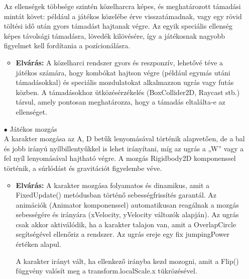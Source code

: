 \documentclass[
]{thesis-ekf}
\theoremstyle{definition}
\theoremstyle{remark}
\begin{document}
\begin{itemize}
	Az ellenségek többsége szintén közelharcra képes, és meghatározott támadási mintát követ: például a játékos közelébe érve visszatámadnak, vagy egy rövid töltési idő után gyors támadást hajtanak végre. Az egyik speciális ellenség képes távolsági támadásra, lövedék kilövésére, így a játékosnak nagyobb figyelmet kell fordítania a pozícionálásra.
	\begin{itemize}
		\item \textbf{Elvárás:} A közelharci rendszer gyors és reszponzív, lehetővé téve a játékos számára, hogy kombókat hajtson végre (például egymás utáni támadásokkal) és speciális mozdulatokat alkalmazzon ugrás vagy futás közben. A támadásokhoz ütközésérzékelés (BoxCollider2D, Raycast stb.) társul, amely pontosan meghatározza, hogy a támadás eltalálta-e az ellenséget.
	\end{itemize}
	\item[$\bullet$] Játékos mozgás\\A karakter mozgása az A, D betűk lenyomásával történik alapvetően, de a bal és jobb irányú nyílbillentyűkkel is lehet irányítani, míg az ugrás a „W” vagy a fel nyíl lenyomásával hajtható végre. A mozgás Rigidbody2D komponenssel történik, a súrlódást és gravitációt figyelembe véve.
	\begin{itemize}
		\item \textbf{Elvárás:} A karakter mozgása folyamatos és dinamikus, amit a FixedUpdate() metódusban történő sebességfrissítés garantál. Az animációk (Animator komponenssel) automatikusan reagálnak a mozgás sebességére és irányára (xVelocity, yVelocity változók alapján).
		Az ugrás csak akkor aktiválódik, ha a karakter talajon van, amit a OverlapCircle segítségével ellenőriz a rendszer. Az ugrás ereje egy fix jumpingPower értéken alapul.
		
		A karakter irányt vált, ha ellenkező irányba kezd mozogni, amit a Flip() függvény valósít meg a transform.localScale.x tükrözésével.
	\end{itemize}
\end{itemize}
\end{document}
